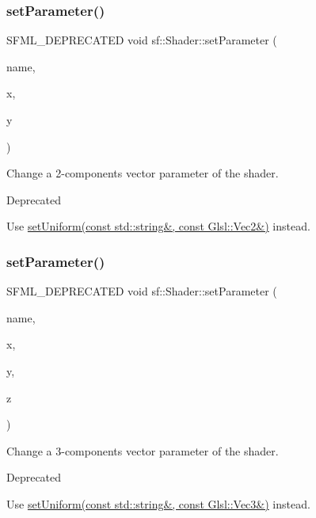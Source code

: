\subsubsection{\texorpdfstring{set\+Parameter()}{setParameter()}\hspace{0.1cm}{\footnotesize\ttfamily [2/10]}}
{\footnotesize\ttfamily S\+F\+M\+L\+\_\+\+D\+E\+P\+R\+E\+C\+A\+T\+ED void sf\+::\+Shader\+::set\+Parameter (\begin{DoxyParamCaption}\item[{const std\+::string \&}]{name,  }\item[{float}]{x,  }\item[{float}]{y }\end{DoxyParamCaption})}



Change a 2-\/components vector parameter of the shader. 

\begin{DoxyRefDesc}{Deprecated}
\item[\hyperlink{deprecated__deprecated000006}{Deprecated}]Use \hyperlink{classsf_1_1_shader_a4a2c673c41e37b17d67e4af1298b679f}{set\+Uniform(const std\+::string\&, const Glsl\+::\+Vec2\&)} instead.\end{DoxyRefDesc}
\mbox{\label{classsf_1_1_shader_a1fa0fb11cabd8553ccd37e97c725c992}} 
\subsubsection{\texorpdfstring{set\+Parameter()}{setParameter()}\hspace{0.1cm}{\footnotesize\ttfamily [3/10]}}
{\footnotesize\ttfamily S\+F\+M\+L\+\_\+\+D\+E\+P\+R\+E\+C\+A\+T\+ED void sf\+::\+Shader\+::set\+Parameter (\begin{DoxyParamCaption}\item[{const std\+::string \&}]{name,  }\item[{float}]{x,  }\item[{float}]{y,  }\item[{float}]{z }\end{DoxyParamCaption})}



Change a 3-\/components vector parameter of the shader. 

\begin{DoxyRefDesc}{Deprecated}
\item[\hyperlink{deprecated__deprecated000007}{Deprecated}]Use \hyperlink{classsf_1_1_shader_aad654ad8de6f0c56191fa7b8cea21db2}{set\+Uniform(const std\+::string\&, const Glsl\+::\+Vec3\&)} instead.\end{DoxyRefDesc}
\mbox{\label{classsf_1_1_shader_a6d6b84575a5f1a869d70a126df8d6478}} 
